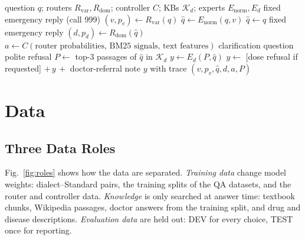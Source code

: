 \begin{algorithm}[!t]
\caption{Answering one question}
\label{alg:infer}
\footnotesize
\begin{algorithmic}[1]
\Require question $q$; routers $R_{\mathrm{var}},R_{\mathrm{dom}}$; controller $C$; KBs $\mathcal{K}_d$; experts $E_{\mathrm{norm}},E_d$
 \Return fixed emergency reply (call 999) \EndIf
\State $(v,p_v)\gets R_{\mathrm{var}}(q)$ 
  \State $\hat q\gets E_{\mathrm{norm}}(q, v)$ 
\Else \State $\hat q\gets q$ \EndIf
{} \Return fixed emergency reply \EndIf
\State $(d,p_d)\gets R_{\mathrm{dom}}(\hat q)$ 
\State $a\gets C(\text{router probabilities, BM25 signals, text features})$
 \Return clarification question \EndIf
{} \Return polite refusal \EndIf
\State $P\gets$ top-3 passages of $\hat q$ in $\mathcal{K}_d$ 
\State $y\gets E_d(P,\hat q)$ 
 \State $y\gets$ [dose refusal if requested] $+\,y\,+$ doctor-referral note \EndIf
\State \Return $y$ with trace $(v,p_v,\hat q,d,a,P)$
\end{algorithmic}
\end{algorithm}

\section{Data}
\label{sec:data}

\subsection{Three Data Roles}
Fig.~\ref{fig:roles} shows how the data are separated. \emph{Training data} change model weights: dialect--Standard pairs, the training splits of the QA datasets, and the router and controller data. \emph{Knowledge} is only searched at answer time: textbook chunks, Wikipedia passages, doctor answers from the training split, and drug and disease descriptions. \emph{Evaluation data} are held out: DEV for every choice, TEST once for reporting.

